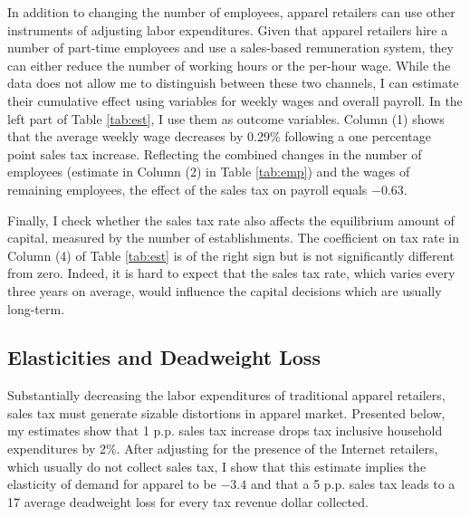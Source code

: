 \documentclass[12pt]{article}
\begin{document}
	In addition to changing the number of employees, apparel retailers can use other instruments of adjusting labor expenditures. Given that apparel retailers hire a number of part-time employees and use a sales-based remuneration system, they can either reduce the number of working hours or the per-hour wage. While the data does not allow me to distinguish between these two channels, I can estimate their cumulative effect using variables for weekly wages and overall payroll. In the left part of Table \ref{tab:est}, I use them as outcome variables. Column (1) shows that the average weekly wage decreases by 0.29\% following a one percentage point sales tax increase.	%
	Reflecting the combined changes in the number of employees (estimate in Column (2) in Table \ref{tab:emp}) and the wages of remaining employees, the effect of the sales tax on payroll equals $-0.63$.
	
	Finally, I check whether the sales tax rate also affects the equilibrium amount of capital, measured by the number of establishments. The coefficient on tax rate in Column (4) of Table \ref{tab:est} is of the right sign but is not significantly different from zero. Indeed, it is hard to expect that the sales tax rate, which varies every three years on average, would influence the capital decisions which are usually long-term.
	
	\subsection{Elasticities and Deadweight Loss}
	\label{sec:dwl}
	
	
		Substantially decreasing the labor expenditures of traditional apparel retailers, sales tax must generate sizable distortions in apparel market. Presented below, my estimates show that 1 p.p. sales tax increase drops tax inclusive household expenditures by 2\%. After adjusting for the presence of the Internet retailers, which usually do not collect sales tax, I show that this estimate implies the elasticity of demand for apparel to be $-3.4$ and that a 5 p.p. sales tax leads to a 17\textcent{} average deadweight loss for every tax revenue dollar collected.  
	
\end{document}
